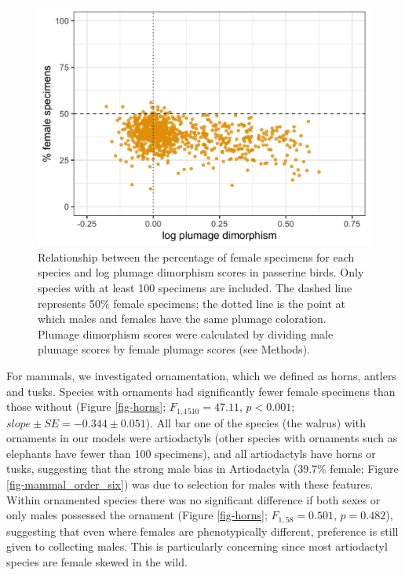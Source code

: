 \documentclass[a4paper, 12pt]{article}
\begin{document}
\begin{figure}
 \centering
  \includegraphics[width = \linewidth]{figures/plumage.png}
  \caption{Relationship between the percentage of female specimens for each species and log plumage dimorphism scores in passerine birds. 
  Only species with at least 100 specimens are included. 
  The dashed line represents 50\% female specimens; the dotted line is the point at which males and females have the same plumage coloration. 
  Plumage dimorphism scores were calculated by dividing male plumage scores by female plumage scores (see Methods). 
}
  \label{fig-plumage}
\end{figure}

For mammals, we investigated ornamentation, which we defined as horns, antlers and tusks. 
Species with ornaments had significantly fewer female specimens than those without (Figure \ref{fig-horns}; $F_{1, 1510} = 47.11$, $p < 0.001$; $slope \pm SE = -0.344 \pm 0.051$). 
All bar one of the species (the walrus) with ornaments in our models were artiodactyls (other species with ornaments such as elephants have fewer than 100 specimens), and all artiodactyls have horns or tusks, suggesting that the strong male bias in Artiodactyla (39.7\% female; Figure \ref{fig-mammal_order_six}) was due to selection for males with these features. 
Within ornamented species there was no significant difference if both sexes or only males possessed the ornament (Figure \ref{fig-horns}; $F_{1, 58} = 0.501$, $p = 0.482$), suggesting that even where females are phenotypically different, preference is still given to collecting males. 
This is particularly concerning since most artiodactyl species are female skewed in the wild\cite{berger1999sex}. 
\end{document}
